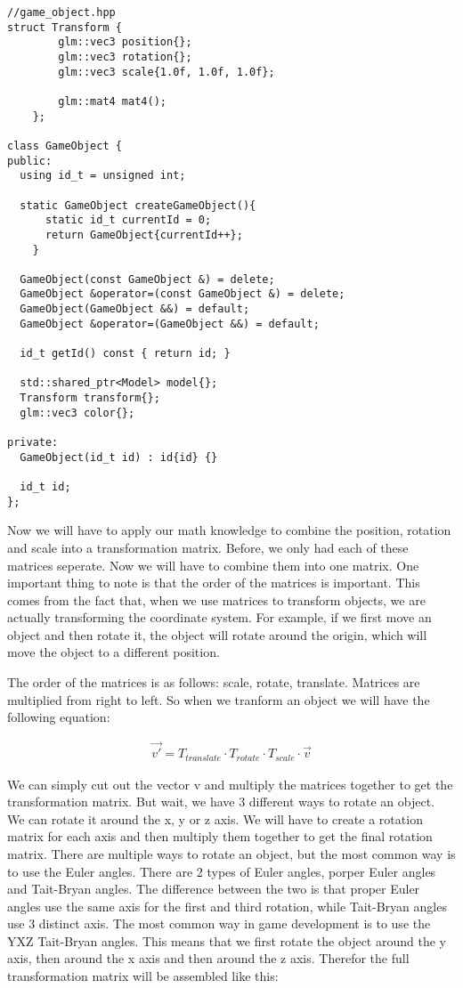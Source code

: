 \documentclass[12pt]{report} \usepackage{preamble}
\begin{document}
\begin{lstlisting}[Language=C++]
//game_object.hpp
struct Transform {
		glm::vec3 position{};
		glm::vec3 rotation{};
		glm::vec3 scale{1.0f, 1.0f, 1.0f};

		glm::mat4 mat4();
	};

class GameObject {
public:
  using id_t = unsigned int;

  static GameObject createGameObject(){
      static id_t currentId = 0;
      return GameObject{currentId++};
    }

  GameObject(const GameObject &) = delete;
  GameObject &operator=(const GameObject &) = delete;
  GameObject(GameObject &&) = default;
  GameObject &operator=(GameObject &&) = default;

  id_t getId() const { return id; }

  std::shared_ptr<Model> model{};
  Transform transform{};
  glm::vec3 color{};

private:
  GameObject(id_t id) : id{id} {}

  id_t id;
};
\end{lstlisting}

Now we will have to apply our math knowledge to combine the position, rotation and scale into a transformation matrix.
Before, we only had each of these matrices seperate. Now we will have to combine them into one matrix.
One important thing to note is that the order of the matrices is important. This comes from the fact that, when we use matrices to transform objects,
we are actually transforming the coordinate system. For example, if we first move an object and then rotate it, the object will rotate around the origin,
which will move the object to a different position.

The order of the matrices is as follows: scale, rotate, translate. Matrices are multiplied from right to left. So when we tranform an object we will have the following equation:

\begin{equation}
	\begin{aligned}
		\vec{v'} = T_{translate} \cdot T_{rotate} \cdot T_{scale} \cdot \vec{v}
	\end{aligned}
\end{equation}

We can simply cut out the vector v and multiply the matrices together to get the transformation matrix. But wait, we have 3 different ways to rotate an object.
We can rotate it around the x, y or z axis. We will have to create a rotation matrix for each axis and then multiply them together to get the final rotation matrix.
There are multiple ways to rotate an object, but the most common way is to use the Euler angles. There are 2 types of Euler angles, porper Euler angles and Tait-Bryan angles.
The difference between the two is that proper Euler angles use the same axis for the first and third rotation, while Tait-Bryan angles use 3 distinct axis.
The most common way in game development is to use the YXZ Tait-Bryan angles. This means that we first rotate the object around the y axis, then around the x axis and then around the z axis.
Therefor the full transformation matrix will be assembled like this:
\end{document}
